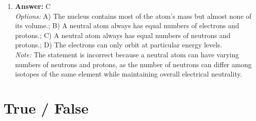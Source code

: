 \documentclass[12pt]{article}
\begin{document}
\begin{enumerate}[label=\arabic*.]
\item \textbf{Answer:} C
\\ \textit{Options:} A) The nucleus contains most of the atom's mass but almost none of its volume.; B) A neutral atom always has equal numbers of electrons and protons.; C) A neutral atom always has equal numbers of neutrons and protons.; D) The electrons can only orbit at particular energy levels.
\\ \textit{Note:} The statement is incorrect because a neutral atom can have varying numbers of neutrons and protons, as the number of neutrons can differ among isotopes of the same element while maintaining overall electrical neutrality.
\end{enumerate}

\section*{True / False}
\end{document}
